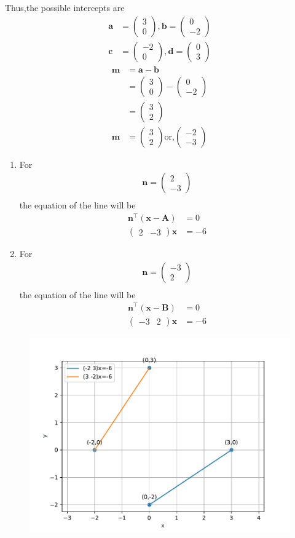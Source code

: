\documentclass[10pt]{article}
\providecommand{\brak}[1]{\ensuremath{\left(#1\right)}}
\newcommand{\myvec}[1]{\ensuremath{\begin{pmatrix}#1\end{pmatrix}}}
\let\vec\mathbf{}
\begin{document}
Thus,the possible intercepts are\\
\begin{align}
\vec{a}&=\myvec{3\\0},\vec{b}=\myvec{0\\-2}\\
\vec{c}&=\myvec{-2\\0},\vec{d}=\myvec{0\\3}
\end{align}
\begin{align}
\vec{m}&=\vec{a}-\vec{b}\\
&=\myvec{3\\0}-\myvec{0\\-2}\\
&=\myvec{3\\2}\\
\vec{m}&=\myvec{3\\2} \text{or,} \myvec{-2\\-3}
\end{align}
\begin{enumerate}
\item For
\begin{align}
\vec{n} = \myvec{ 2\\-3}\\
\end{align}
the equation of the line will be\\
\begin{align}
\vec{n}^{\top}\brak{\vec{x}-\vec{A}}&=0\\
\myvec{2&-3}\vec{x}&=-6
\end{align}
\item For
\begin{align}
\vec{n}=\myvec{-3\\2}\\
\end{align}
the equation of the line will be\\
\begin{align}
\vec{n}^{\top}\brak{\vec{x}-\vec{B}}&=0\\
\myvec{-3&2}\vec{x}&=-6
\end{align}
\end{enumerate}
\begin{figure}[!h]
	\begin{center}
		\includegraphics[width=\columnwidth]{./figs/fig.pdf}
	\end{center}
\caption{}
\label{figure}
\end{figure}
\end{document}
